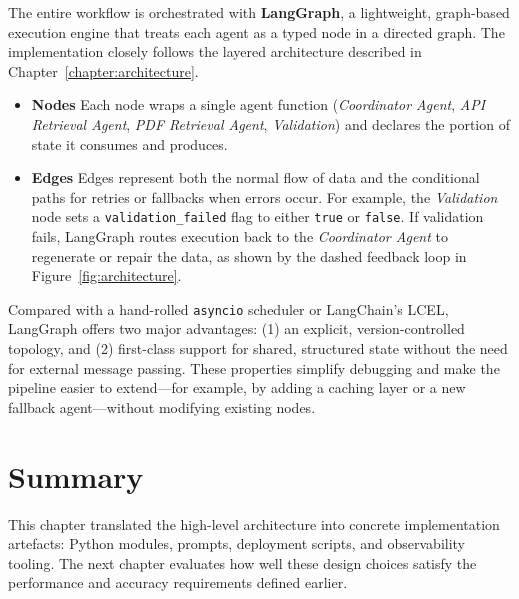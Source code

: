 The entire workflow is orchestrated with \textbf{LangGraph}, a lightweight, graph-based execution engine that treats each agent as a typed node in a directed graph. The implementation closely follows the layered architecture described in Chapter~\ref{chapter:architecture}.
\begin{itemize}
  \item \textbf{Nodes} \quad Each node wraps a single agent function (\emph{Coordinator Agent}, \emph{API Retrieval Agent}, \emph{PDF Retrieval Agent}, \emph{Validation}) and declares the portion of state it consumes and produces.
  \item \textbf{Edges} \quad Edges represent both the normal flow of data and the conditional paths for retries or fallbacks when errors occur. For example, the \emph{Validation} node sets a \verb|validation_failed| flag to either \texttt{true} or \texttt{false}. If validation fails, LangGraph routes execution back to the \emph{Coordinator Agent} to regenerate or repair the data, as shown by the dashed feedback loop in Figure~\ref{fig:architecture}.
\end{itemize}

Compared with a hand-rolled \texttt{asyncio} scheduler or LangChain's LCEL, LangGraph offers two major advantages: (1) an explicit, version-controlled topology, and (2) first-class support for shared, structured state without the need for external message passing. These properties simplify debugging and make the pipeline easier to extend—for example, by adding a caching layer or a new fallback agent—without modifying existing nodes.

\section{Summary}

This chapter translated the high-level architecture into concrete implementation artefacts: Python modules, prompts, deployment scripts, and observability tooling.  The next chapter evaluates how well these design choices satisfy the performance and accuracy requirements defined earlier.